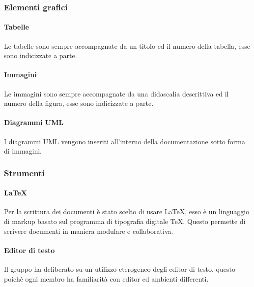 		\subsubsection{Elementi grafici}
			\paragraph{Tabelle}
				Le tabelle sono sempre accompagnate da un titolo ed il numero della tabella, esse sono indicizzate a parte.
			\paragraph{Immagini}
				Le immagini sono sempre accompagnate da una didascalia descrittiva ed il numero della figura, esse sono indicizzate a parte.
			\paragraph{Diagrammi UML}
				I diagrammi UML vengono inseriti all'interno della documentazione sotto forma di immagini.
		\subsubsection{Strumenti}
			\paragraph{LaTeX}
				Per la scrittura dei documenti è stato scelto di usare \LaTeX{}, esso è un linguaggio di markup basato sul programma di tipografia digitale \TeX{}. Questo permette di scrivere documenti in maniera modulare e collaborativa.
			\paragraph{Editor di testo}
				Il gruppo ha deliberato su un utilizzo eterogeneo degli editor di testo, questo poichè ogni membro ha familiarità con editor ed ambienti differenti.
